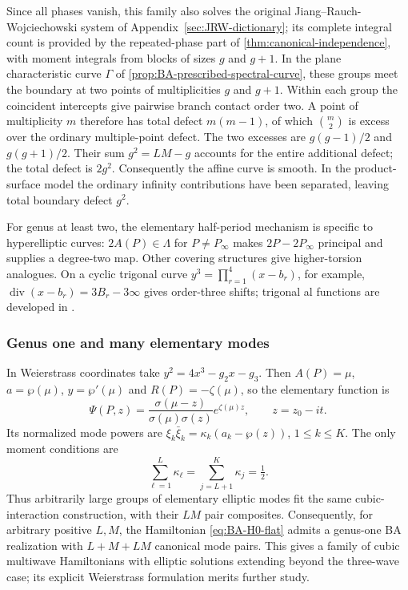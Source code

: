 Since all phases vanish, this family also solves the original
Jiang--Rauch-Wojciechowski system of
Appendix~\ref{sec:JRW-dictionary}; its complete integral count is
provided by the repeated-phase part of
\cref{thm:canonical-independence}, with moment integrals from blocks
of sizes $g$ and $g+1$.
In the plane characteristic curve $\Gamma$ of
\cref{prop:BA-prescribed-spectral-curve}, these groups meet the boundary
at two points of multiplicities $g$ and $g+1$.
Within each group the coincident intercepts give pairwise branch
contact order two. A point of multiplicity $m$ therefore has total
defect $m(m-1)$, of which $\binom m2$ is excess over the ordinary
multiple-point defect. The two excesses are $g(g-1)/2$ and
$g(g+1)/2$. Their sum $g^2=LM-g$ accounts for the entire additional
defect; the total defect is $2g^2$. Consequently the affine curve
is smooth. In the product-surface model the ordinary infinity
contributions have been separated, leaving total boundary defect $g^2$.

For genus at least two, the elementary half-period mechanism is
specific to hyperelliptic curves: $2A(P)\in\Lambda$ for $P\ne P_\infty$ makes
$2P-2P_\infty$ principal and supplies a degree-two map.
Other covering structures give higher-torsion analogues. On a cyclic
trigonal curve $y^3=\prod_{r=1}^{4}(x-b_r)$, for example,
$\operatorname{div}(x-b_r)=3B_r-3\infty$ gives order-three shifts;
trigonal al functions are developed in
\cite[Section~8]{MatsutaniPreviato2015}.

\subsubsection{Genus one and many elementary modes}

In Weierstrass coordinates take
$y^2=4x^3-g_2x-g_3$. Then $A(P)=\mu$,
$a=\wp(\mu)$, $y=\wp'(\mu)$ and
$R(P)=-\zeta(\mu)$, so the elementary function is
\begin{equation}\label{eq:BA-elliptic}
 \Psi(P,z)=\frac{\sigma(\mu-z)}{\sigma(\mu)\sigma(z)}
                  e^{\zeta(\mu)z},\qquad z=z_0-it.
\end{equation}
Its normalized mode powers are
$\xi_k\bar{\xi}_k=\kappa_k(a_k-\wp(z))$, $1\leq k\leq K$.
The only moment conditions are
\[
 \sum_{\ell=1}^{L}\kappa_{\ell}
 =\sum_{j=L+1}^{K}\kappa_j=\tfrac12.
\]
Thus arbitrarily large groups of elementary elliptic modes fit the
same cubic-interaction construction, with their $LM$ pair composites.
Consequently, for arbitrary positive $L,M$, the Hamiltonian
\cref{eq:BA-H0-flat} admits a genus-one BA realization with
$L+M+LM$ canonical mode pairs. This gives a family of cubic
multiwave Hamiltonians with elliptic solutions extending beyond the
three-wave case; its explicit Weierstrass formulation merits further study.


